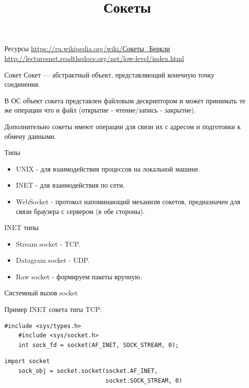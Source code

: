 
\usepackage{array}      %

\title{Сокеты}



\frame{\titlepage}

\begin{frame}{Ресурсы}
    \url{https://ru.wikipedia.org/wiki/Сокеты\_Беркли}\newline
    \url{http://lecturesnet.readthedocs.org/net/low-level/index.html}
\end{frame}

\begin{frame}{Сокет}
    Сокет — абстрактный объект, представляющий конечную точку соединения.

    В ОС объект сокета представлен файловым дескриптором и может принимать те
    же операции что и файл (открытие - чтение/запись - закрытие).

    Дополнительно  сокеты имеют операции для связи их с адресом и подготовки к
    обмену данными.
\end{frame}

\begin{frame}{Типы}
    \begin{itemize}
        \item UNIX - для взаимодействия процессов на локальной машине.
        \item INET - для взаимодействия по сети.
        \item WebSocket - протокол напоминающий механизм сокетов, предназначен
            для связи браузера с сервером (в обе стороны).
    \end{itemize}
\end{frame}

\begin{frame}{INET типы}
    \begin{itemize}
        \item Stream socket - TCP.
        \item Datagram socket - UDP.
        \item Raw socket - формируем пакеты вручную.
    \end{itemize}
\end{frame}

\begin{frame}[fragile]{Системный вызов socket}

    Пример INET сокета типа TCP:

    \begin{lstlisting}[style=cpp, caption=Си]
    #include <sys/types.h>
    #include <sys/socket.h>
    int sock_fd = socket(AF_INET, SOCK_STREAM, 0);
    \end{lstlisting}

    \begin{lstlisting}[style=python, caption=Python]
    import socket
    sock_obj = socket.socket(socket.AF_INET,
                             socket.SOCK_STREAM, 0)
    \end{lstlisting}
\end{frame}

